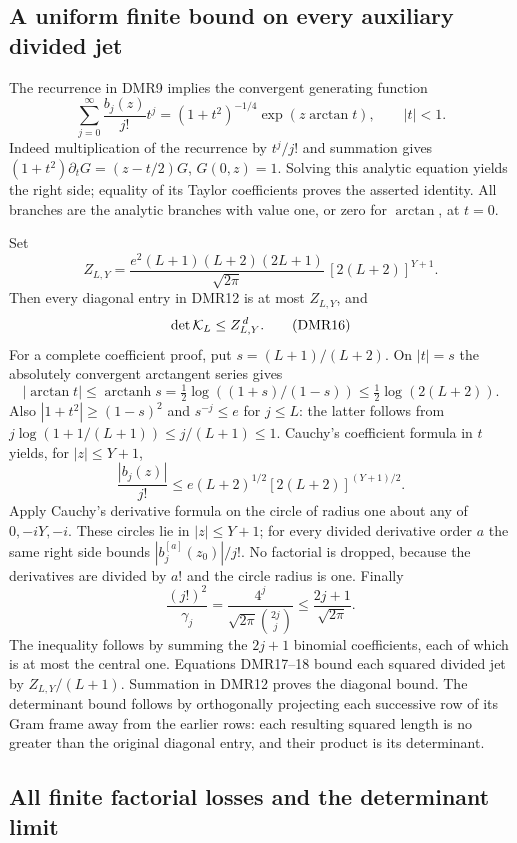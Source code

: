 \subsection{A uniform finite bound on every auxiliary divided jet}

The recurrence in DMR9 implies the convergent generating function
\[
 \sum_{j=0}^\infty \frac{b_j(z)}{j!}t^j
       =(1+t^2)^{-1/4}\exp(z\arctan t),\qquad |t|<1.
 \tag{DMR14}
\]
Indeed multiplication of the recurrence by $t^j/j!$ and summation
gives $(1+t^2)\partial_t G=(z-t/2)G$, $G(0,z)=1$.
Solving this analytic equation yields the right side; equality
of its Taylor coefficients proves the asserted identity.
All branches are the analytic branches with value one, or zero
for $\arctan$, at $t=0$.

Set
\[
 Z_{L,Y}=\frac{e^2(L+1)(L+2)(2L+1)}{\sqrt{2\pi}}\,
                  [2(L+2)]^{Y+1}.
 \tag{DMR15}
\]
Then every diagonal entry in DMR12 is at most $Z_{L,Y}$, and
\[
 \det{\cal K}_L\leq Z_{L,Y}^{\,d}.
 \tag{DMR16}
\]
For a complete coefficient proof, put $s=(L+1)/(L+2)$.
On $|t|=s$ the absolutely convergent arctangent series gives
\[
 |\arctan t|\leq\operatorname{arctanh}s
 =\tfrac12\log((1+s)/(1-s))
 \leq\tfrac12\log(2(L+2)).
\]
Also $|1+t^2|\geq(1-s)^2$ and $s^{-j}\leq e$ for $j\leq L$:
the latter follows from
$j\log(1+1/(L+1))\leq j/(L+1)\leq1$.
Cauchy's coefficient formula in $t$ yields, for $|z|\leq Y+1$,
\[
 \frac{|b_j(z)|}{j!}
 \leq e(L+2)^{1/2}[2(L+2)]^{(Y+1)/2}.
 \tag{DMR17}
\]
Apply Cauchy's derivative formula on the circle of radius one
about any of $0,-iY,-i$. These circles lie in $|z|\leq Y+1$;
for every divided derivative order $a$ the same right side
bounds $|b_j^{[a]}(z_0)|/j!$. No factorial is dropped, because
the derivatives are divided by $a!$ and the circle radius is one.
Finally
\[
 \frac{(j!)^2}{\gamma_j}
 =\frac{4^j}{\sqrt{2\pi}\binom{2j}{j}}
 \leq\frac{2j+1}{\sqrt{2\pi}} .
 \tag{DMR18}
\]
The inequality follows by summing the $2j+1$ binomial coefficients,
each of which is at most the central one. Equations DMR17--18
bound each squared divided jet by $Z_{L,Y}/(L+1)$.
Summation in DMR12 proves the diagonal bound. The determinant
bound follows by orthogonally projecting each successive row
of its Gram frame away from the earlier rows: each resulting
squared length is no greater than the original diagonal
entry, and their product is its determinant.

\subsection{All finite factorial losses and the determinant limit}

